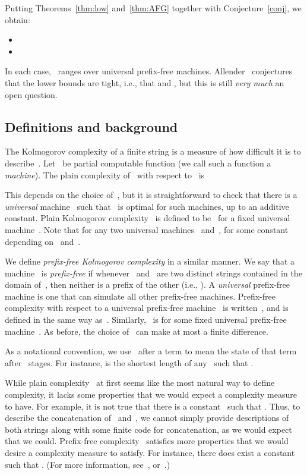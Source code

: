\documentclass{LMCS}
\newcommand{\0}{\mathbf{0}}
\newcommand{\<}{\langle}
\renewcommand{\>}{\rangle}
\begin{document}
Putting Theorems~\ref{thm:low} and~\ref{thm:AFG} together with
Conjecture~\ref{conj}, we obtain:
\begin{itemize}
\item 
\item 
\end{itemize}
In each case,~ ranges over universal prefix-free machines.
Allender~\cite{allender} conjectures that the lower bounds are tight, i.e.,
that  and
, but this is still
\emph{very much} an open question.

\subsection{Definitions and background}\label{background}

The Kolmogorov complexity of a finite string \mbox{}
is a measure of how difficult it is to describe~. Let~ be partial computable function (we call such a
function a \emph{machine}). The plain complexity of~ with respect
to~ is

This depends on the choice of~, but it is straightforward to check that
there is a \emph{universal} machine~ such that~ is optimal for such
machines, up to an additive constant. Plain Kolmogorov complexity~ is
defined to be~ for a fixed universal machine~. Note that for any two
universal machines~ and~,  for some
constant~ depending on~ and~.

We define \emph{prefix-free Kolmogorov complexity} in a similar manner. We
say that a machine~ is \emph{prefix-free}
if whenever~ and~ are two distinct strings contained in the
domain of~, then neither is a prefix of the other (i.e.,
).  A \emph{universal} prefix-free machine is one that can
simulate all other prefix-free machines. Prefix-free complexity with respect
to a universal prefix-free machine~ is written~, and is
defined in the same way as~.  Similarly,~ is
 for some fixed universal prefix-free machine~.  As before,
the choice of~ can make at most a finite difference.

As a notational convention, we use~ after a term to mean the state of
that term after~ stages.  For instance,  is
the shortest length of any~ such that .

While plain complexity~ at first seems like the most natural way to define
complexity, it lacks some properties that we would expect a complexity
measure to have.  For example, it is not true that there is a constant~
such that .  Thus, to describe the
concatenation of~ and~, we cannot simply provide descriptions
of both strings along with some finite code for concatenation, as we would
expect that we could.  Prefix-free complexity~ satisfies more properties
that we would desire a complexity measure to satisfy.  For instance, there
does exist a constant~ such that .
(For more information, see~\cite[p.~83]{Nies},
or~\cite[p.~121]{Downey-Hirschfeldt}.)
\end{document}
